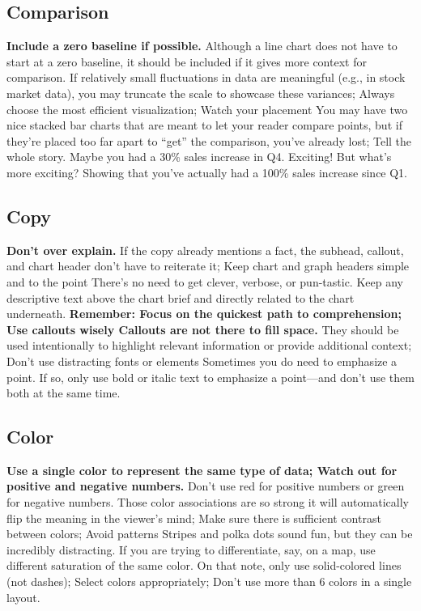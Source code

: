 \documentclass[]{book}
\theoremstyle{definition}
\theoremstyle{definition}
\theoremstyle{definition}
\theoremstyle{remark}
\begin{document}
\subsection{Comparison}\label{comparison-1}

\textbf{Include a zero baseline if possible.} Although a line chart does
not have to start at a zero baseline, it should be included if it gives
more context for comparison. If relatively small fluctuations in data
are meaningful (e.g., in stock market data), you may truncate the scale
to showcase these variances; Always choose the most efficient
visualization; Watch your placement You may have two nice stacked bar
charts that are meant to let your reader compare points, but if they're
placed too far apart to ``get'' the comparison, you've already lost;
Tell the whole story. Maybe you had a 30\% sales increase in Q4.
Exciting! But what's more exciting? Showing that you've actually had a
100\% sales increase since Q1.

\subsection{Copy}\label{copy-1}

\textbf{Don't over explain.} If the copy already mentions a fact, the
subhead, callout, and chart header don't have to reiterate it; Keep
chart and graph headers simple and to the point There's no need to get
clever, verbose, or pun-tastic. Keep any descriptive text above the
chart brief and directly related to the chart underneath.
\textbf{Remember: Focus on the quickest path to comprehension; Use
callouts wisely Callouts are not there to fill space.} They should be
used intentionally to highlight relevant information or provide
additional context; Don't use distracting fonts or elements Sometimes
you do need to emphasize a point. If so, only use bold or italic text to
emphasize a point---and don't use them both at the same time.

\subsection{Color}\label{color-1}

\textbf{Use a single color to represent the same type of data; Watch out
for positive and negative numbers.} Don't use red for positive numbers
or green for negative numbers. Those color associations are so strong it
will automatically flip the meaning in the viewer's mind; Make sure
there is sufficient contrast between colors; Avoid patterns Stripes and
polka dots sound fun, but they can be incredibly distracting. If you are
trying to differentiate, say, on a map, use different saturation of the
same color. On that note, only use solid-colored lines (not dashes);
Select colors appropriately; Don't use more than 6 colors in a single
layout.
\end{document}

